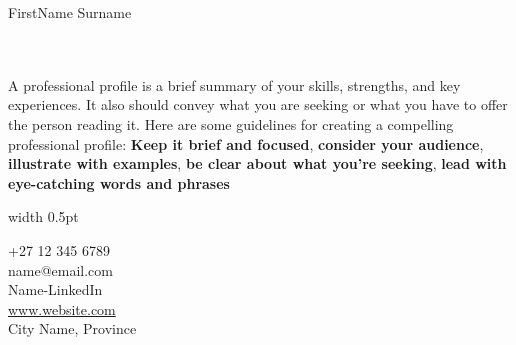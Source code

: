 \documentclass[12pt, a4paper, conference]{IEEEtran}
\newcommand{\borderthickness}{0.5pt}
\begin{document}
\begin{minipage}{\textwidth}
{\fontsize{50}{1}\selectfont FirstName \color{orange}Surname}
\\
\end{minipage}

\noindent\makebox[\linewidth]{\textcolor{bordercolour}{\rule{\paperwidth}{\borderthickness}}}


\begin{minipage}[t][5cm][t]{0.7\textwidth}
{}\\
\\
A professional profile is a brief summary of your skills, strengths, and key experiences. It also should convey what you are seeking or what you have to offer the person reading it. Here are some guidelines for creating a compelling professional profile: \textbf{Keep it brief and focused}, \textbf{consider your audience}, \textbf{illustrate with examples}, \textbf{be clear about what you're seeking}, \textbf{lead with eye-catching words and phrases} 
\end{minipage}
\quad
\textcolor{bordercolour}{\vrule height 3ex width \borderthickness}
\quad
\begin{minipage}[t][5cm][t]{0.2\textwidth}
+27 12 345 6789\\

name@email.com\\

Name-LinkedIn\\

\url{www.website.com}\\

City Name, Province
\end{minipage}

\noindent\makebox[\linewidth]{\textcolor{bordercolour}{\rule{\paperwidth}{\borderthickness}}}
\end{document}
